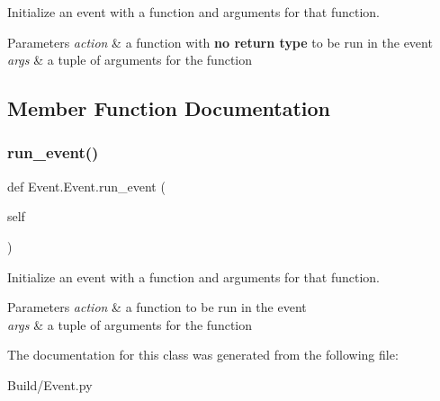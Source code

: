 Initialize an event with a function and arguments for that function. 


\begin{DoxyParams}{Parameters}
{\em action} & a function with {\bfseries no return type} to be run in the event \\
\hline
{\em args} & a tuple of arguments for the function \\
\hline
\end{DoxyParams}


\subsection{Member Function Documentation}
\mbox{\label{class_event_1_1_event_a06520d9b62a64266891af59f31c5ccad}} 
\subsubsection{\texorpdfstring{run\+\_\+event()}{run\_event()}}
{\footnotesize\ttfamily def Event.\+Event.\+run\+\_\+event (\begin{DoxyParamCaption}\item[{}]{self }\end{DoxyParamCaption})}



Initialize an event with a function and arguments for that function. 


\begin{DoxyParams}{Parameters}
{\em action} & a function to be run in the event \\
\hline
{\em args} & a tuple of arguments for the function \\
\hline
\end{DoxyParams}


The documentation for this class was generated from the following file\+:\begin{DoxyCompactItemize}
\item 
Build/Event.\+py\end{DoxyCompactItemize}
